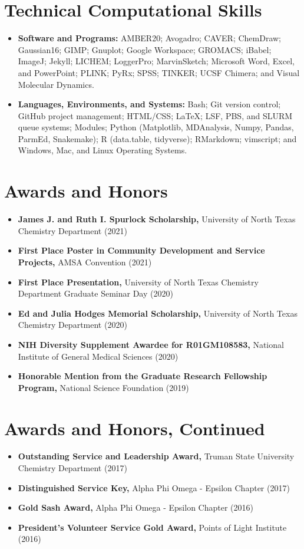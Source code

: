 \documentclass[letterpaper,11pt]{article}
\newcommand{\resumeItem}[2]{
  \item\small{
    \textbf{#1}{ #2 \vspace{-2pt}}
  }
}
\newcommand{\resumeSubItem}[2]{\resumeItem{#1}{#2}\vspace{-4pt}}
\newcommand{\resumeSubHeadingListStart}{\begin{itemize}[leftmargin=*]}
\newcommand{\resumeSubHeadingListEnd}{\end{itemize}}
\begin{document}
\section{Technical Computational Skills}
  \resumeSubHeadingListStart
    \resumeSubItem{Software and Programs:}
      {AMBER20; Avogadro; CAVER; ChemDraw; Gaussian16; GIMP; Gnuplot; Google Workspace; GROMACS; iBabel; ImageJ; Jekyll; LICHEM; LoggerPro; MarvinSketch; Microsoft Word, Excel, and PowerPoint; PLINK; PyRx; SPSS; TINKER; UCSF Chimera; and Visual Molecular Dynamics.}
      \resumeSubItem{Languages, Environments, and Systems:}
      {Bash; Git version control; GitHub project management; HTML/CSS; \LaTeX; LSF, PBS, and SLURM queue systems; Modules; Python (Matplotlib, MDAnalysis, Numpy, Pandas, ParmEd, Snakemake); R (data.table, tidyverse); RMarkdown; vimscript; and Windows, Mac, and Linux Operating Systems.}
\resumeSubHeadingListEnd

\section{Awards and Honors}
  \resumeSubHeadingListStart
   \resumeSubItem{James J. and Ruth I. Spurlock Scholarship\textnormal{,}}
      {University of North Texas Chemistry Department (2021)}
   \resumeSubItem{First Place Poster in Community Development and Service Projects\textnormal{,}}
      {AMSA Convention (2021)}
   \resumeSubItem{First Place Presentation\textnormal{,}}
      {University of North Texas Chemistry Department Graduate Seminar Day (2020)}
   \resumeSubItem{Ed and Julia Hodges Memorial Scholarship\textnormal{,}}
      {University of North Texas Chemistry Department (2020)}
   \resumeSubItem{NIH Diversity Supplement Awardee for R01GM108583\textnormal{,}}
      {National Institute of General Medical Sciences (2020)}
   \resumeSubItem{Honorable Mention from the Graduate Research Fellowship Program\textnormal{,}}
      {National Science Foundation (2019)}
  \resumeSubHeadingListEnd      

\newpage
{}
\fancyfoot[C]{\thepage}

\section{Awards and Honors, Continued}
  \resumeSubHeadingListStart
    \resumeSubItem{Outstanding Service and Leadership Award\textnormal{,}}
      {Truman State University Chemistry Department (2017)}
    \resumeSubItem{Distinguished Service Key\textnormal{,}}
      {Alpha Phi Omega - Epsilon Chapter (2017)}
    \resumeSubItem{Gold Sash Award\textnormal{,}}
      {Alpha Phi Omega - Epsilon Chapter (2016)}
    \resumeSubItem{President's Volunteer Service Gold Award\textnormal{,}}
      {Points of Light Institute (2016)}
  \resumeSubHeadingListEnd
\end{document}
